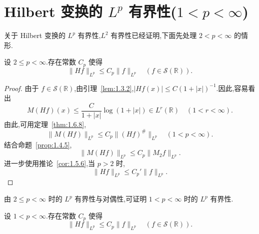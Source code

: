 \section{\texorpdfstring{Hilbert 变换的 $L^p$ 有界性($1<p<\infty$)}{Hilbert 变换的 Lp 有界性(1<p<∞)}}\label{sec:1.7}


关于 Hilbert 变换的 $L^{p}$ 有界性,$L^{2}$ 有界性已经证明,下面先处理 $2 < p < \infty$ 的情形.

\begin{proposition}\label{prop:1.7.1}
设 $2 \leq p < \infty$.存在常数 $C_{p}$ 使得
\begin{equation*}
\| Hf \|_{L^{p}} \leq C_{p}\| f \|_{L^{p}} \quad (f \in \mathcal{S}(\mathbb{R})).
\end{equation*}
\end{proposition}

\begin{proof}
由于 $f \in \mathcal{S}(\mathbb{R})$,由引理~\ref{lem:1.3.2},$|Hf(x)| \leq C(1 + |x|)^{-1}$.因此,容易看出
\begin{equation*}
M(Hf)(x) \leq \frac{C}{1 + |x|}\log(1 + |x|) \in L^{r}(\mathbb{R}) \quad (1 < r < \infty).
\end{equation*}
由此,可用定理~\ref{thm:1.6.8},
\begin{equation*}
\| M(Hf) \|_{L^{p}} \leq C_{p}\| (Hf)^{\#} \|_{L^{p}} \quad (1 < p < \infty).
\end{equation*}
结合命题~\ref{prop:1.4.5},
\begin{equation*}
\| M(Hf) \|_{L^{p}} \leq C_{p}\| M_{2}f \|_{L^{p}}.
\end{equation*}
进一步使用推论~\ref{cor:1.5.6},当 $p > 2$ 时,
\begin{equation*}
\| Hf \|_{L^{p}} \leq C_{p}'\| f \|_{L^{p}}.
\end{equation*}
\end{proof}

由 $2 \leq p < \infty$ 时的 $L^{p}$ 有界性与对偶性,可证明 $1 < p < \infty$ 时的 $L^{p}$ 有界性.

\begin{theorem}\label{thm:1.7.2}
设 $1 < p < \infty$.存在常数 $C_{p}$ 使得
\begin{equation*}
\| Hf \|_{L^{p}} \leq C_{p}\| f \|_{L^{p}} \quad (f \in \mathcal{S}(\mathbb{R})).
\end{equation*}
\end{theorem}

